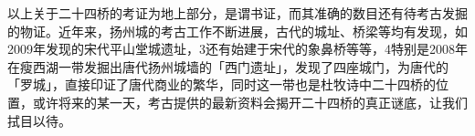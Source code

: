 以上关于二十四桥的考证为地上部分，是谓书证，而其准确的数目还有待考古发掘的物证。近年来，扬州城的考古工作不断进展，古代的城址、桥梁等均有发现，如2009年发现的宋代平山堂城遗址，3还有始建于宋代的象鼻桥等等，4特别是2008年在瘦西湖一带发掘出唐代扬州城墙的「西门遗址」，发现了四座城门，为唐代的「罗城」，直接印证了唐代商业的繁华，同时这一带也是杜牧诗中二十四桥的位置，或许将来的某一天，考古提供的最新资料会揭开二十四桥的真正谜底，让我们拭目以待。

\vfill
\begin{BookNotes}
\end{BookNotes}
